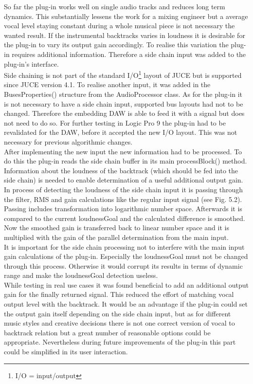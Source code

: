 So far the plug-in works well on single audio tracks and reduces long term dynamics. This substantially lessens the work for a mixing engineer but a average vocal level staying constant during a whole musical piece is not necessary the wanted result. If the instrumental backtracks varies in loudness it is desirable for the plug-in to vary its output gain accordingly. To realise this variation the plug-in requires additional information. Therefore a side chain input was added to the plug-in's interface.\\
Side chaining is not part of the standard I/O\footnote{I/O = input/output} layout of JUCE but is supported since JUCE version 4.1. To realise another input, it was added in the BusesProperties() structure from the AudioProcessor class. As for the plug-in it is not necessary to have a side chain input, supported bus layouts had not to be changed. Therefore the embedding DAW is able to feed it with a signal but does not need to do so. For further testing in Logic Pro 9 the plug-in had to be revalidated for the DAW, before it accepted the new I/O layout. This was not necessary for previous algorithmic changes.\\
After implementing the new input the new information had to be processed. To do this the plug-in reads the side chain buffer in its main processBlock() method. Information about the loudness of the backtrack (which should be fed into the side chain) is needed to enable determination of a useful additional output gain. In process of detecting the loudness of the side chain input it is passing through the filter, RMS and gain calculations like the regular input signal (see Fig. 5.2). Passing includes transformation into logarithmic number space. Afterwards it is compared to the current loudnessGoal and the calculated difference is smoothed. Now the smoothed gain is transferred back to linear number space and it is multiplied with the gain of the parallel determination from the main input.\\
It is important for the side chain processing not to interfere with the main input gain calculations of the plug-in. Especially the loudnessGoal must not be changed through this process. Otherwise it would corrupt its results in terms of dynamic range and make the loudnessGoal detection useless.\\
While testing in real use cases it was found beneficial to add an additional output gain for the finally returned signal. This reduced the effort of matching vocal output level with the backtrack. It would be an advantage if the plug-in could set the output gain itself depending on the side chain input, but as for different music styles and creative decisions there is not one correct version of vocal to backtrack relation but a great number of reasonable options could be appropriate. Nevertheless during future improvements of the plug-in this part could be simplified in its user interaction.\\
